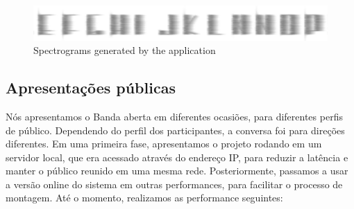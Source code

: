 \begin{figure}[!ht]
    
        \includegraphics[width=1\textwidth]{pictures/spectrogram}
        \vspace{-10pt}
    \caption{Spectrograms generated by the application}
    \vspace{-10pt}
    \label{fig:spectro}
\end{figure}







\subsection{Apresentações públicas}
Nós apresentamos o Banda aberta em diferentes ocasiões, para diferentes perfis de público. Dependendo do perfil dos participantes, a conversa foi para direções diferentes. Em uma primeira fase, apresentamos o projeto rodando em um servidor local, que era acessado através do endereço IP, para reduzir a latência e manter o público reunido em uma mesma rede. Posteriormente, passamos a usar a versão online do sistema em outras performances, para facilitar o processo de montagem. Até o momento, realizamos as performance seguintes:

